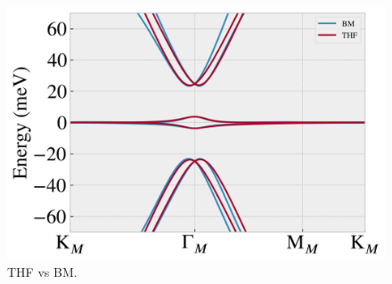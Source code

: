 \begin{figure}[H]
\centering
\includegraphics[width=0.9\linewidth]{fig/thf_continuum_model_vF_1.3_factor_N1.png}
\caption{THF vs BM.}
\label{fig:THF_vs_BM}
\end{figure}







%



